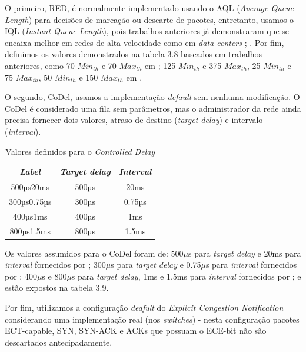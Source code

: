 O primeiro, RED, é normalmente implementado usando o AQL (\emph{Average Queue Length}) para decisões de marcação ou descarte de pacotes, entretanto, usamos o IQL (\emph{Instant Queue Length}), pois trabalhos anteriores já demonstraram que se encaixa melhor em redes de alta velocidade como em \emph{data centers} \cite{alizadeh2010data}; \cite {silva2018eon}. Por fim, definimos os valores demonstrados na tabela 3.8 baseados em trabalhos anteriores, como 70 {$\mathit{Min}_\mathit{th}$} e 70 {$\mathit{Max}_\mathit{th}$}  em \cite{alizadeh2010data}; 125 {$\mathit{Min}_\mathit{th}$} e 375 {$\mathit{Max}_\mathit{th}$}, 25 {$\mathit{Min}_\mathit{th}$} e 75 {$\mathit{Max}_\mathit{th}$}, 50 {$\mathit{Min}_\mathit{th}$} e 150 {$\mathit{Max}_\mathit{th}$} em \cite{silva2018eon}.

O segundo, CoDel, usamos a implementação \emph{default} sem nenhuma modificação. O CoDel é considerado uma fila sem parâmetros, mas o administrador da rede ainda precisa fornecer dois valores, atraso de destino (\emph{target delay}) e intervalo (\emph{interval}).

\begin{table}[!htp]
\centering
\caption{Valores definidos para o \emph{Controlled Delay}}
\label{Valores definidos para o CoDel}
\def\arraystretch{1.2}
\begin{tabular}{c c c}
\hline
\emph{Label} & \emph{Target delay} & \emph{Interval}\\
\hline
500µs20ms & 500µs  & 20ms\\
300µs0.75µs & 300µs  & 0.75µs\\
400µs1ms & 400µs  & 1ms\\
800µs1.5ms & 800µs  & 1.5ms\\
\hline
\end{tabular}
\end{table}

Os valores assumidos para o CoDel foram de: 500$\mu$s para \emph{target delay} e 20ms para \emph{interval} fornecidos por \cite{bufferbloat}; 300$\mu$s para \emph{target delay} e 0.75$\mu$s para \emph{interval} fornecidos por \cite{ismaileffectiveness}; 400$\mu$s e 800$\mu$s para \emph{target delay}, 1ms e 1.5ms para \emph{interval} fornecidos por \cite{silva2018eon}; e estão expostos na tabela 3.9.

Por fim, utilizamos a configuração \emph{deafult} do \emph{Explicit Congestion Notification} considerando uma implementação real (nos \emph{switches}) - nesta configuração pacotes ECT-capable, SYN, SYN-ACK e ACKs que possuam o ECE-bit não são descartados antecipadamente.

